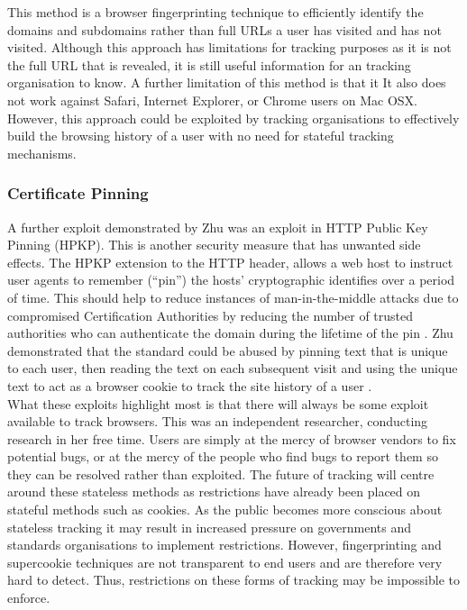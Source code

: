 \documentclass[12pt]{article}
\begin{document}
This method is a browser fingerprinting technique to efficiently identify the domains and subdomains rather than full URLs a user has visited and has not visited. Although this approach has limitations for tracking purposes as it is not the full URL that is revealed, it is still useful information for an tracking organisation to know. A further limitation of this method is that it It also does not work against Safari, Internet Explorer, or Chrome users on Mac OSX. However, this approach could be exploited by tracking organisations to effectively build the browsing history of a user with no need for stateful tracking mechanisms. 

\subsubsection{Certificate Pinning}
A further exploit demonstrated by Zhu was an exploit in HTTP Public Key Pinning (HPKP). This is another security measure that has unwanted side effects. The HPKP extension to the HTTP header, allows a web host to instruct user agents to remember (``pin'') the hosts' cryptographic identifies over a period of time. This should help to reduce instances of man-in-the-middle attacks due to compromised Certification Authorities by reducing the number of trusted authorities who can authenticate the domain during the lifetime of the pin \parencite{HPKP}. Zhu demonstrated that the standard could be abused by pinning text that is unique to each user, then reading the text on each subsequent visit and using the unique text to act as a browser cookie to track the site history of a user \parencite{newTracking}. \\

What these exploits highlight most is that there will always be some exploit available to track browsers. This was an independent researcher, conducting research in her free time. Users are simply at the mercy of browser vendors to fix potential bugs, or at the mercy of the people who find bugs to report them so they can be resolved rather than exploited. The future of tracking will centre around these stateless methods as restrictions have already been placed on stateful methods such as cookies. As the public becomes more conscious about stateless tracking it may result in increased pressure on governments and standards organisations to implement restrictions. However, fingerprinting and supercookie techniques are not transparent to end users and are therefore very hard to detect. Thus, restrictions on these forms of tracking may be impossible to enforce. 
\end{document}
